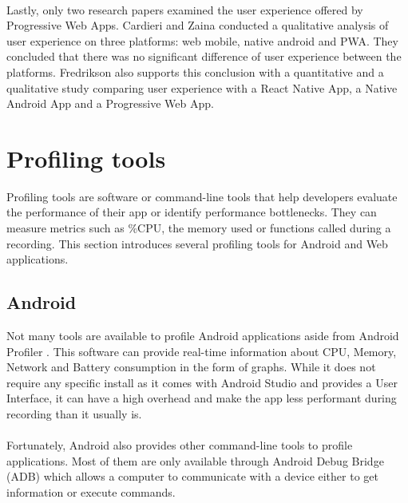 \documentclass{kththesis}
\begin{document}
\paragraph{}
Lastly, only two research papers examined the user experience offered by Progressive Web Apps. Cardieri and Zaina \cite{PWA_UX_comparison_study} conducted a qualitative analysis of user experience on three platforms: web mobile, native android and PWA. They concluded that there was no significant difference of user experience between the platforms. Fredrikson \cite{emulating_native_w_crossplatform} also supports this conclusion with a quantitative and a qualitative study comparing user experience with a React Native App, a Native Android App and a Progressive Web App. 

\section{Profiling tools}

Profiling tools are software or command-line tools that help developers evaluate the performance of their app or identify performance bottlenecks. They can measure metrics such as \%CPU, the memory used or functions called during a recording.
This section introduces several profiling tools for Android and Web applications.



\subsection{Android}

Not many tools are available to profile Android applications aside from Android Profiler \cite{nanoscope}. This software can provide real-time information about CPU, Memory, Network and Battery consumption in the form of graphs. While it does not require any specific install as it comes with Android Studio and provides a User Interface, it can have a high overhead \cite{nanoscope} and make the app less performant during recording than it usually is. 

\paragraph{}
Fortunately, Android also provides other command-line tools to profile applications. Most of them are only available through Android Debug Bridge (ADB) \cite{adb} which allows a computer to communicate with a device either to get information or execute commands. 
\end{document}
